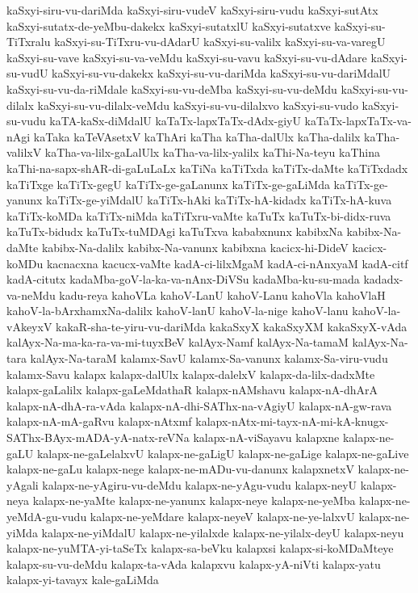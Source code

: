 {kaSxyi-siru-vu-dariMda
kaSxyi-siru-vudeV
kaSxyi-siru-vudu
kaSxyi-sutAtx
kaSxyi-sutatx-de-yeMbu-dakekx
kaSxyi-sutatxlU
kaSxyi-sutatxve
kaSxyi-su-TiTxralu
kaSxyi-su-TiTxru-vu-dAdarU
kaSxyi-su-valilx
kaSxyi-su-va-varegU
kaSxyi-su-vave
kaSxyi-su-va-veMdu
kaSxyi-su-vavu
kaSxyi-su-vu-dAdare
kaSxyi-su-vudU
kaSxyi-su-vu-dakekx
kaSxyi-su-vu-dariMda
kaSxyi-su-vu-dariMdalU
kaSxyi-su-vu-da-riMdale
kaSxyi-su-vu-deMba
kaSxyi-su-vu-deMdu
kaSxyi-su-vu-dilalx
kaSxyi-su-vu-dilalx-veMdu
kaSxyi-su-vu-dilalxvo
kaSxyi-su-vudo
kaSxyi-su-vudu
kaTA-kaSx-diMdalU
kaTaTx-lapxTaTx-dAdx-giyU
kaTaTx-lapxTaTx-va-nAgi
kaTaka
kaTeVAsetxV
kaThAri
kaTha
kaTha-dalUlx
kaTha-dalilx
kaTha-valilxV
kaTha-va-lilx-gaLalUlx
kaTha-va-lilx-yalilx
kaThi-Na-teyu
kaThina
kaThi-na-sapx-shAR-di-gaLuLaLx
kaTiNa
kaTiTxda
kaTiTx-daMte
kaTiTxdadx
kaTiTxge
kaTiTx-gegU
kaTiTx-ge-gaLanunx
kaTiTx-ge-gaLiMda
kaTiTx-ge-yanunx
kaTiTx-ge-yiMdalU
kaTiTx-hAki
kaTiTx-hA-kidadx
kaTiTx-hA-kuva
kaTiTx-koMDa
kaTiTx-niMda
kaTiTxru-vaMte
kaTuTx
kaTuTx-bi-didx-ruva
kaTuTx-bidudx
kaTuTx-tuMDAgi
kaTuTxva
kababxnunx
kabibxNa
kabibx-Na-daMte
kabibx-Na-dalilx
kabibx-Na-vanunx
kabibxna
kacicx-hi-DideV
kacicx-koMDu
kacnacxna
kacucx-vaMte
kadA-ci-lilxMgaM
kadA-ci-nAnxyaM
kadA-citf
kadA-citutx
kadaMba-goV-la-ka-va-nAnx-DiVSu
kadaMba-ku-su-mada
kadadx-va-neMdu
kadu-reya
kahoVLa
kahoV-LanU
kahoV-Lanu
kahoVla
kahoVlaH
kahoV-la-bArxhamxNa-dalilx
kahoV-lanU
kahoV-la-nige
kahoV-lanu
kahoV-la-vAkeyxV
kakaR-sha-te-yiru-vu-dariMda
kakaSxyX
kakaSxyXM
kakaSxyX-vAda
kalAyx-Na-ma-ka-ra-va-mi-tuyxBeV
kalAyx-Namf
kalAyx-Na-tamaM
kalAyx-Na-tara
kalAyx-Na-taraM
kalamx-SavU
kalamx-Sa-vanunx
kalamx-Sa-viru-vudu
kalamx-Savu
kalapx
kalapx-dalUlx
kalapx-dalelxV
kalapx-da-lilx-dadxMte
kalapx-gaLalilx
kalapx-gaLeMdathaR
kalapx-nAMshavu
kalapx-nA-dhArA
kalapx-nA-dhA-ra-vAda
kalapx-nA-dhi-SAThx-na-vAgiyU
kalapx-nA-gw-rava
kalapx-nA-mA-gaRvu
kalapx-nAtxmf
kalapx-nAtx-mi-tayx-nA-mi-kA-knugx-SAThx-BAyx-mADA-yA-natx-reVNa
kalapx-nA-viSayavu
kalapxne
kalapx-ne-gaLU
kalapx-ne-gaLelalxvU
kalapx-ne-gaLigU
kalapx-ne-gaLige
kalapx-ne-gaLive
kalapx-ne-gaLu
kalapx-nege
kalapx-ne-mADu-vu-danunx
kalapxnetxV
kalapx-ne-yAgali
kalapx-ne-yAgiru-vu-deMdu
kalapx-ne-yAgu-vudu
kalapx-neyU
kalapx-neya
kalapx-ne-yaMte
kalapx-ne-yanunx
kalapx-neye
kalapx-ne-yeMba
kalapx-ne-yeMdA-gu-vudu
kalapx-ne-yeMdare
kalapx-neyeV
kalapx-ne-ye-lalxvU
kalapx-ne-yiMda
kalapx-ne-yiMdalU
kalapx-ne-yilalxde
kalapx-ne-yilalx-deyU
kalapx-neyu
kalapx-ne-yuMTA-yi-taSeTx
kalapx-sa-beVku
kalapxsi
kalapx-si-koMDaMteye
kalapx-su-vu-deMdu
kalapx-ta-vAda
kalapxvu
kalapx-yA-niVti
kalapx-yatu
kalapx-yi-tavayx
kale-gaLiMda
}
